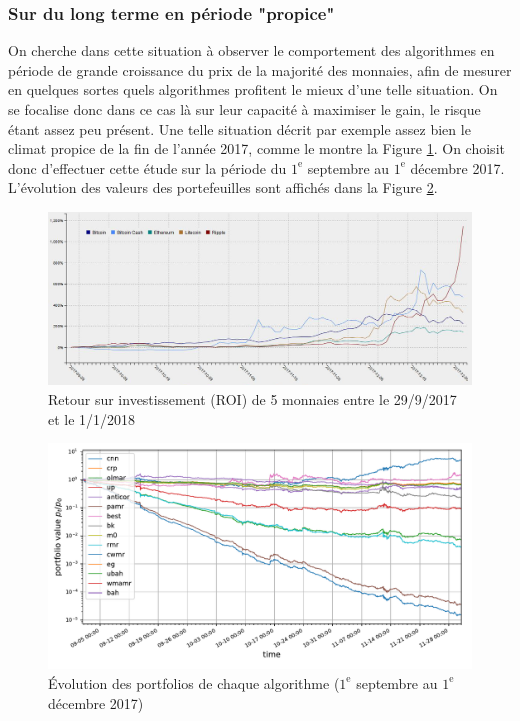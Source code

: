 \documentclass[a4paper, 10pt]{article}
\begin{document}
\subsubsection{Sur du long terme en période "propice"}
\label{sec:theorie_empirique_propice}

On cherche dans cette situation à observer le comportement des algorithmes en période de grande croissance du prix de la majorité des monnaies, afin de mesurer en quelques sortes quels algorithmes profitent le mieux d'une telle situation. On se focalise donc dans ce cas là sur leur capacité à maximiser le gain, le risque étant assez peu présent. Une telle situation décrit par exemple assez bien le climat propice de la fin de l'année 2017, comme le montre la Figure \ref{fig:roi_high}. On choisit donc d'effectuer cette étude sur la période du $1^{\text{e}}$ septembre au $1^{\text{e}}$ décembre 2017. L'évolution des valeurs des portefeuilles sont affichés dans la Figure \ref{fig:plot_high}.

\begin{figure}[ht!]
\begin{center}
\includegraphics[width=1.0\textwidth]{images/ROI_high.JPG}
\caption{Retour sur investissement (ROI) de 5 monnaies entre le 29/9/2017 et le 1/1/2018}
\label{fig:roi_high}
\end{center}
\end{figure}

\begin{figure}[ht!]
\begin{center}
\includegraphics[width=1.0\textwidth]{images/plot_high.pdf}
\caption{Évolution des portfolios de chaque algorithme ($1^{\text{e}}$ septembre au $1^{\text{e}}$ décembre 2017)}
\label{fig:plot_high}
\end{center}
\end{figure}
\end{document}
